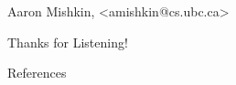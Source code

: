 \documentclass[mathserif,notheorems]{beamer}
\title{}
\author{}
\institute{}
\date{}
\def\\{}%
\def\texttt#1{<#1>}%
\begin{document}
        \begin{frame}
        \vspace{1em}
        \begin{center}
            {\Large  \vspace{1em}} %


            {\large  \vspace{1em} } %

            {\large Aaron Mishkin, \\ \texttt{amishkin@cs.ubc.ca} } %
        \end{center}

        \vspace{2em}

        \begin{figure}
            \centering

        \end{figure}

    \end{frame}


    \begin{frame}{}

    \end{frame}



    \begin{frame}{}
        \begin{center}
        \huge Thanks for Listening!
        \end{center}
    \end{frame}

    \begin{frame}[allowframebreaks]{References}
        
        
    \end{frame}
\end{document}
